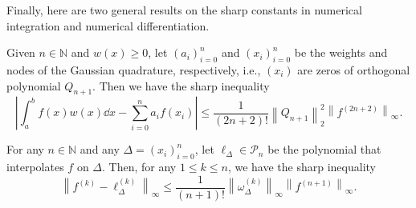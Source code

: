 \documentclass[a4paper]{article}
\begin{document}
Finally, here are two general results on the sharp constants in numerical integration and numerical differentiation.

\begin{theorem}
    Given $n \in \mathbb{N}$ and $w(x) \geq 0$, let $\left(a_i\right)_{i=0}^n$ and $\left(x_i\right)_{i=0}^n$ be the weights and nodes of the Gaussian quadrature, respectively, i.e., $\left(x_i\right)$ are zeros of orthogonal polynomial $Q_{n+1}$. Then we have the sharp inequality
\[
\left|\int_a^b f(x) w(x) \dd{x}-\sum_{i=0}^n a_i f\left(x_i\right)\right| \leq \frac{1}{(2 n+2) !}\left\|Q_{n+1}\right\|_2^2\left\|f^{(2 n+2)}\right\|_{\infty} .
\]
\end{theorem}
\begin{theorem}[Shadrin]
    For any $n \in \mathbb{N}$ and any $\Delta=\left(x_i\right)_{i=0}^n$, let $\ell_{\Delta} \in \mathcal{P}_n$ be the polynomial that interpolates $f$ on $\Delta$. Then, for any $1 \leq k \leq n$, we have the sharp inequality
\[
\left\|f^{(k)}-\ell_{\Delta}^{(k)}\right\|_{\infty} \leq \frac{1}{(n+1) !}\left\|\omega_{\Delta}^{(k)}\right\|_{\infty}\left\|f^{(n+1)}\right\|_{\infty} .
\]
\end{theorem}
\end{document}
